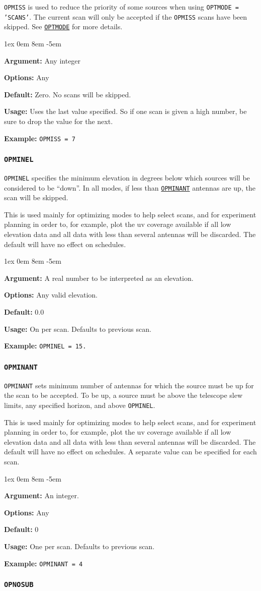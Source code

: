 \documentclass{report}
\newcommand{\rcwbox}[5]{
  \begin{list}{}{\parsep 1ex  \itemsep 0em
                 \leftmargin 8em  \itemindent -5em }
    \item {\bf Argument:} #1
    \item {\bf Options:}  #2
    \item {\bf Default:}  #3
    \item {\bf Usage:}    #4
    \item {\bf Example:}  #5
  \end{list}
}
\begin{document}
{\tt OPMISS} is used to reduce the priority of some sources when
using {\tt OPTMODE = 'SCANS'}.  The current scan will only be
accepted if the {\tt OPMISS} scans have been skipped.  See
{\hyperref[MP:OPTMODE]{{\tt OPTMODE}}} for more details.

\rcwbox
{Any integer}
{Any}
{Zero.  No scans will be skipped.}
{Uses the last value specified.  So if one scan is given a high
number, be sure to drop the value for the next.}
{{\tt OPMISS = 7}}

\subsubsection{\label{MP:OPMINEL}{\tt OPMINEL}}

{\tt OPMINEL} specifies the minimum elevation in degrees below which
sources will be considered to be ``down''.  In all modes, if less than
{\hyperref[MP:OPMINANT]{{\tt OPMINANT}}} antennas are up, the scan will
be skipped.

This is used mainly for optimizing modes to help select scans, and
for experiment planning in order to, for example, plot the uv
coverage available if all low elevation data and all data with less
than several antennas will be discarded.  The default will have no
effect on schedules.

\rcwbox
{A real number to be interpreted as an elevation.}
{Any valid elevation.}
{0.0}
{On per scan.  Defaults to previous scan.}
{{\tt OPMINEL = 15.}}


\subsubsection{\label{MP:OPMINANT}{\tt OPMINANT}}

{\tt OPMINANT} sets minimum number of antennas for which the
source must be up for the scan to be accepted.  To be up, a source
must be above the telescope slew limits, any specified horizon, and
above {\tt OPMINEL}.

This is used mainly for optimizing modes to help select scans, and
for experiment planning in order to, for example, plot the uv
coverage available if all low elevation data and all data with less
than several antennas will be discarded.  The default will have no
effect on schedules.  A separate value can be specified for each
scan.

\rcwbox
{An integer. }
{Any}
{0}
{One per scan.  Defaults to previous scan.}
{{\tt OPMINANT = 4}}


\subsubsection{\label{MP:OPNOSUB}{\tt OPNOSUB}}
\end{document}
